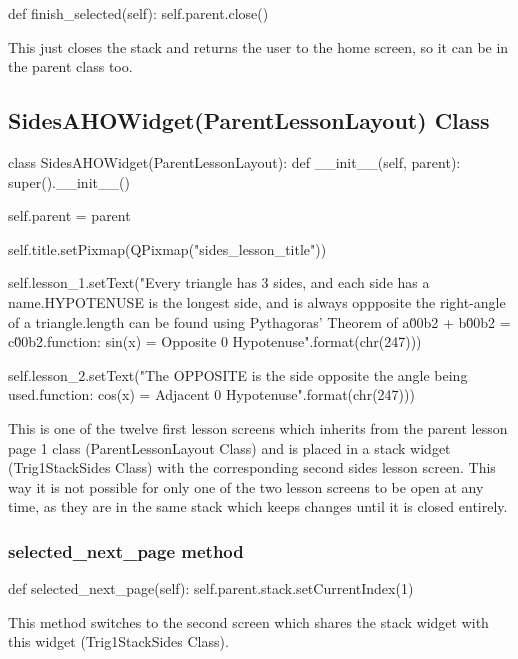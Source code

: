 \begin{python}
def finish_selected(self):
        self.parent.close()
\end{python}

This just closes the stack and returns the user to the home screen, so it can be in the parent class too.

\subsection{SidesAHOWidget(ParentLessonLayout) Class}

\begin{python}
class SidesAHOWidget(ParentLessonLayout):
    def __init__(self, parent):
        super().__init__()

        self.parent = parent

        self.title.setPixmap(QPixmap("sides_lesson_title"))

        self.lesson_1.setText("Every triangle has 3 sides, and each side has a name.\nThe HYPOTENUSE is the longest side, and is always oppposite the right-angle of a triangle.\nThe length can be found using Pythagoras' Theorem of a\u00b2 + b\u00b2 = c\u00b2.\nSine function: sin(x) = Opposite {0} Hypotenuse".format(chr(247)))

        self.lesson_2.setText("The OPPOSITE is the side opposite the angle being used.\nCosine function: cos(x) = Adjacent {0} Hypotenuse".format(chr(247)))
\end{python}

This is one of the twelve first lesson screens which inherits from the parent lesson page 1 class (ParentLessonLayout Class) and is placed in a stack widget (Trig1StackSides Class) with the corresponding second sides lesson screen. This way it is not possible for only one of the two lesson screens to be open at any time, as they are in the same stack which keeps changes until it is closed entirely.

\subsubsection{selected\_next\_page method}

\begin{python}
def selected_next_page(self):
        self.parent.stack.setCurrentIndex(1)
\end{python}

This method switches to the second screen which shares the stack widget with this widget (Trig1StackSides Class).

